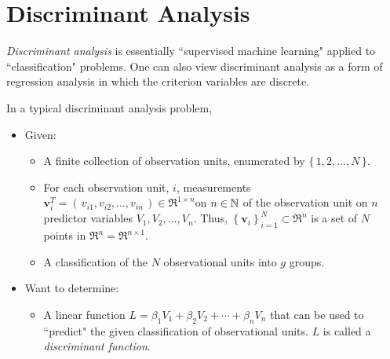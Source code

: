 \documentclass{article}
\begin{document}


\pagestyle{fancy}

%

\lfoot[]{}
\cfoot[]{}
\rfoot[]{\thepage}



\section{Discriminant Analysis}
\setcounter{theorem}{0}

\emph{Discriminant analysis} is essentially ``supervised machine learning" applied to ``classification" problems.  One can also view discriminant analysis as a form of regression analysis in which the criterion variables are discrete.

In a typical discriminant analysis problem,
\begin{itemize}
\item  Given:
           \begin{itemize}
               \item  A finite collection of observation units, enumerated by $\{\,1,2,\ldots,N\,\}$.
               \item  For each observation unit, $i$, measurements
                         $\mathbf{v}^{T}_{i} = \left(\,v_{i1},v_{i2},\ldots,v_{in}\,\right) \in \Re^{1 \times n}$on $n \in \mathbb{N}$
                         of the observation unit on $n$ predictor variables $V_{1},V_{2},\ldots,V_{n}$.
                         Thus, $\left\{\mathbf{v}_{i}\right\}^{N}_{i=1} \subset \Re^{n}$ is a set of
                         $N$ points in $\Re^{n} = \Re^{n \times 1}$.
               \item  A classification of the $N$ observational units into $g$ groups.
           \end{itemize}
\item  Want to determine:
          \begin{itemize}
          \item  A linear function $L = \beta_{1}V_{1} + \beta_{2}V_{2} + \cdots + \beta_{n}V_{n}$ that
                    can be used to ``predict" the given classification of observational units.
                    $L$ is called a \emph{discriminant function}.
          \end{itemize}
\end{itemize}
\end{document}
